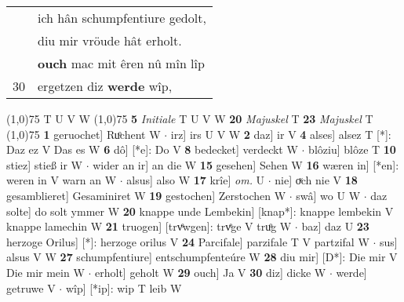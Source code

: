 \documentclass[8pt,a4paper,notitlepage]{article}
\begin{document}
\begin{table}[ht]
\begin{minipage}[t]{0.5\linewidth}
\begin{tabular}{rl}
 & ich hân schumpfentiure gedolt,\\ 
 & diu mir vröude hât erholt.\\ 
 & \textbf{ouch} mac mit êren nû mîn lîp\\ 
30 & ergetzen diz \textbf{werde} wîp,\\ 
\end{tabular}
\scriptsize
\line(1,0){75} \newline
T U V W \newline
\line(1,0){75} \newline
\textbf{5} \textit{Initiale} T U V W  \textbf{20} \textit{Majuskel} T  \textbf{23} \textit{Majuskel} T  \newline
\line(1,0){75} \newline
\textbf{1} geruochet] Ruͦchent W  $\cdot$ irz] irs U V W \textbf{2} daz] ir V \textbf{4} alses] alsez T [*]: Daz ez V Das es W \textbf{6} dô] [*e]: Do V \textbf{8} bedecket] verdeckt W  $\cdot$ blôziu] blôze T \textbf{10} stiez] stieß ir W  $\cdot$ wider an ir] an die W \textbf{15} gesehen] Sehen W \textbf{16} wæren in] [*en]: weren in V warn an W  $\cdot$ alsus] also W \textbf{17} krîe] \textit{om.} U  $\cdot$ nie] oͮch nie V \textbf{18} gesamblieret] Gesaminiret W \textbf{19} gestochen] Zerstochen W  $\cdot$ swâ] wo U W  $\cdot$ daz solte] do solt ymmer W \textbf{20} knappe unde Lembekin] [knap*]: knappe lembekin V knappe lamechin W \textbf{21} truogen] [trvͤwgen]: trvͤge V truͦg W  $\cdot$ baz] daz U \textbf{23} herzoge Orilus] [*]: herzoge orilus V \textbf{24} Parcifale] parzifale T V partzifal W  $\cdot$ sus] alsus V W \textbf{27} schumpfentiure] entschumpfenteúre W \textbf{28} diu mir] [D*]: Die mir V Die mir mein W  $\cdot$ erholt] geholt W \textbf{29} ouch] Ja V \textbf{30} diz] dicke W  $\cdot$ werde] getruwe V  $\cdot$ wîp] [*ip]: wip T leib W \newline
\end{minipage}
\end{table}
\end{document}
